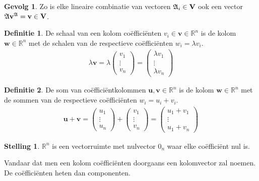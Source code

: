 \documentclass{amsart}
\theoremstyle{definition}
\newtheorem{thm}{Stelling}[section]
\newtheorem{dfn}{Definitie}[section]
\newtheorem{csq}{Gevolg}[section]
\newcommand{\realnums}{\mathbb{R}}
\newcommand{\realn}[1][n]{\realnums^{#1}}
\newcommand{\vecspace}[1][v]{\mathrm{\mathbf{\MakeUppercase#1}}}
\newcommand{\vvec}[1][v]{\mathbf{#1}}
\newcommand{\vecrow}[1][a]{\mathfrak{\MakeUppercase{#1}}}
\newcommand{\rvec}[2][i]{{#2}_{#1}}
\newcommand{\rvecr}[2][i]{\rvec[#1]{\vecrow[#2]}}
\newcommand{\rveci}[1][i]{\rvecr[#1]{a}}
\newcommand{\cvec}[2]{{#1}^{#2}}
\newcommand{\cvecv}[2][v]{\cvec{\vvec[#1]}{#2}}
\newcommand{\cvecva}[1][a]{\cvecv{\vecrow[#1]}}
\begin{document}
\begin{csq}
	Zo is elke lineaire combinatie van vectoren $\rveci \in \vecspace$ ook een vector $\vecrow \cvecva = \vvec \in \vecspace$.
\end{csq}

\begin{dfn}
	De schaal van een kolom coëfficiënten $v_i \in \vvec \in \realn$ is de kolom $\vvec[w] \in \realn$ met de schalen van de respectieve coëfficiënten ${w}_i = \lambda {v}_i$.
	\begin{align*}
		\lambda \vvec =
		\lambda
		\begin{pmatrix}
			v_1    \\
			\vdots \\
			v_n
		\end{pmatrix}
		=
		\begin{pmatrix}
			\lambda v_1 \\
			\vdots      \\
			\lambda v_n
		\end{pmatrix}
	\end{align*}
\end{dfn}

\begin{dfn}
	De som van coëfficiëntkolommen $\vvec[u], \vvec \in \realn$ is de kolom $\vvec[w] \in \realn$ met de sommen van de respectieve coëfficiënten ${w}_i = {u}_i + {v}_i$.
	\begin{align*}
		\vvec[u] + \vvec =
		\begin{pmatrix}
			u_1    \\
			\vdots \\
			u_n
		\end{pmatrix}
		+
		\begin{pmatrix}
			v_1    \\
			\vdots \\
			v_n
		\end{pmatrix}
		=
		\begin{pmatrix}
			u_1 + v_1 \\
			\vdots    \\
			u_1 + v_n
		\end{pmatrix}
	\end{align*}
\end{dfn}

\begin{thm}
	$\realn$ is een vectorruimte met nulvector $0_n$ waar elke coëfficiënt nul is.
\end{thm}

Vandaar dat men een kolom coëfficiënten doorgaans een kolomvector zal noemen. De coëfficiënten heten dan componenten.
\end{document}
